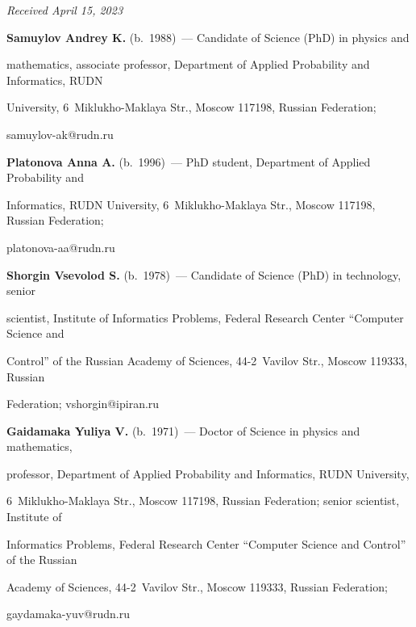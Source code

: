\vspace*{-6pt}



\hfill{\small\textit{Received April 15, 2023}} 

  

  \Contr

  

  \noindent

  \textbf{Samuylov Andrey K.} (b.\ 1988)~--- Candidate of Science (PhD) in physics and 

mathematics, associate professor, Department of Applied Probability and Informatics, RUDN 

University, 6~Miklukho-Maklaya Str., Moscow 117198, Russian Federation;  

\mbox{samuylov-ak@rudn.ru}

  

  \vspace*{3pt}

  

  \noindent

  \textbf{Platonova Anna A.} (b.\ 1996)~--- PhD student, Department of Applied Probability and 

Informatics, RUDN University, 6~Miklukho-Maklaya Str., Moscow 117198, Russian Federation; 

\mbox{platonova-aa@rudn.ru}

  

  \vspace*{3pt}

  

  \noindent

  \textbf{Shorgin Vsevolod S.} (b.\ 1978)~--- Candidate of Science (PhD) in technology, senior 

scientist, Institute of Informatics Problems, Federal Research Center ``Computer Science and 

Control'' of the Russian Academy of Sciences, 44-2~Vavilov Str., Moscow 119333, Russian 

Federation; \mbox{vshorgin@ipiran.ru}

  

  \vspace*{3pt}

  

  \noindent

  \textbf{Gaidamaka Yuliya V.} (b.\ 1971)~--- Doctor of Science in physics and mathematics, 

professor, Department of Applied Probability and Informatics, RUDN University,  

6~Miklukho-Maklaya Str., Moscow 117198, Russian Federation; senior scientist, Institute of 

Informatics Problems, Federal Research Center ``Computer Science and Control'' of the Russian 

Academy of Sciences, 44-2~Vavilov Str., Moscow 119333, Russian Federation;  

\mbox{gaydamaka-yuv@rudn.ru}

  

\label{end\stat}



\renewcommand{\bibname}{\protect\rm Литература} 

